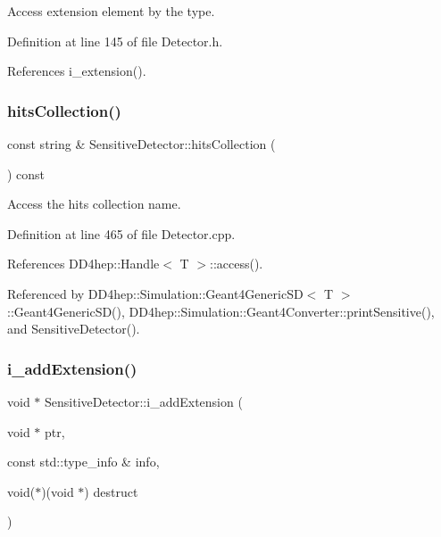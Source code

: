 Access extension element by the type. 



Definition at line 145 of file Detector.\+h.



References i\+\_\+extension().

\hypertarget{class_d_d4hep_1_1_geometry_1_1_sensitive_detector_aa6a837d3029a062ccd6705d5a0e7d5b1}{}\label{class_d_d4hep_1_1_geometry_1_1_sensitive_detector_aa6a837d3029a062ccd6705d5a0e7d5b1} 
\subsubsection{\texorpdfstring{hits\+Collection()}{hitsCollection()}}
{\footnotesize\ttfamily const string \& Sensitive\+Detector\+::hits\+Collection (\begin{DoxyParamCaption}{ }\end{DoxyParamCaption}) const}



Access the hits collection name. 



Definition at line 465 of file Detector.\+cpp.



References D\+D4hep\+::\+Handle$<$ T $>$\+::access().



Referenced by D\+D4hep\+::\+Simulation\+::\+Geant4\+Generic\+S\+D$<$ T $>$\+::\+Geant4\+Generic\+S\+D(), D\+D4hep\+::\+Simulation\+::\+Geant4\+Converter\+::print\+Sensitive(), and Sensitive\+Detector().

\hypertarget{class_d_d4hep_1_1_geometry_1_1_sensitive_detector_a210f2df5c333b59b69b148bf089a8719}{}\label{class_d_d4hep_1_1_geometry_1_1_sensitive_detector_a210f2df5c333b59b69b148bf089a8719} 
\subsubsection{\texorpdfstring{i\+\_\+add\+Extension()}{i\_addExtension()}}
{\footnotesize\ttfamily void $\ast$ Sensitive\+Detector\+::i\+\_\+add\+Extension (\begin{DoxyParamCaption}\item[{void $\ast$}]{ptr,  }\item[{const std\+::type\+\_\+info \&}]{info,  }\item[{void($\ast$)(void $\ast$)}]{destruct }\end{DoxyParamCaption})\hspace{0.3cm}{\ttfamily [protected]}}



